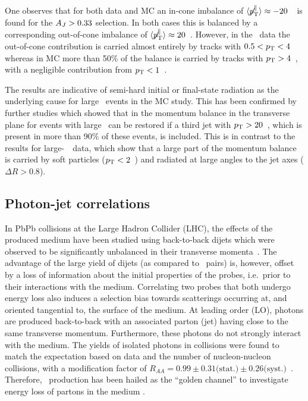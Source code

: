 One observes that for both data and MC an in-cone imbalance of $\langle \displaystyle{\not} p_{\mathrm{T}}^{\parallel} \rangle \approx
-20$~\GeVc\ is found for the $A_J > 0.33$ selection. In both cases this is balanced by a corresponding out-of-cone
imbalance of  $\langle \displaystyle{\not} p_{\mathrm{T}}^{\parallel} \rangle \approx 20$~\GeVc. However, in the \PbPb\ data
the out-of-cone contribution is carried almost entirely  by tracks with $0.5 < p_{\rm{T}} < 4$~\GeVc\, whereas in MC more than 50\% of the balance
is carried by tracks with $p_{\rm{T}} > 4$~\GeVc, with a negligible contribution from $p_{\rm{T}} < 1$~\GeVc.


The {} results are indicative of semi-hard initial or final-state radiation as the underlying cause for large
\AJ\ events in the MC study. This has been confirmed by further studies which showed that in {} the momentum balance
in the transverse plane for events with large \AJ\ can be restored if a third jet with $p_{\rm{T}} > 20$~\GeVc, which is present in more
than 90\% of these events, is included. This is in contrast to the results for large-\AJ\ \PbPb\ data, which show that a
large part of the momentum balance is carried by soft particles ($p_{\rm{T}} < 2$~\GeVc) and radiated
at large angles to the jet axes ($\Delta R > 0.8$).

\subsection{Photon-jet correlations}

In PbPb collisions at the Large Hadron Collider (LHC), the
effects of the produced medium have been studied using back-to-back
dijets which were observed to be significantly unbalanced in their transverse momenta~\cite{Chatrchyan:2011sx,Aad:2010bu,CMS:2012ni}. The advantage of the large yield of dijets (as compared to \photonjet\ pairs)
is, however, offset by a loss of information about the initial properties of the probes, i.e.\
prior to their interactions with the medium.
Correlating two probes that both undergo energy loss also
induces a selection bias towards scatterings occurring at,
and oriented tangential to, the surface of the medium.
At leading order (LO), photons are produced back-to-back with an associated parton (jet) having close
to the same transverse momentum.
Furthermore, these photons do not strongly interact with the medium.
The yields of isolated photons in \PbPb{} collisions were found to match
the expectation based on \pp{} data and the number of nucleon-nucleon
collisions, with a modification factor of $R_{AA} = 0.99\pm
0.31\mbox{(stat.)}\pm 0.26\mbox{(syst.)}$~\cite{HIPhoton}.
Therefore, \photonjet\ production has been hailed as the ``golden channel'' to
investigate energy loss of partons in the medium \cite{Wang:1996yh,Wang:1996pe}.

